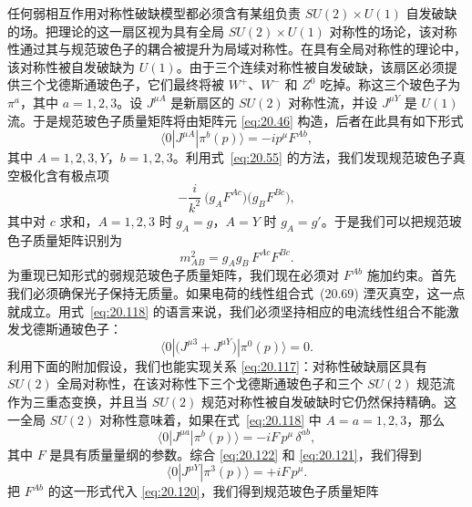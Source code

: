 任何弱相互作用对称性破缺模型都必须含有某组负责 $SU(2)\times U(1)$ 自发破缺的场。把理论的这一扇区视为具有全局 $SU(2)\times U(1)$ 对称性的场论，该对称性通过其与规范玻色子的耦合被提升为局域对称性。在具有全局对称性的理论中，该对称性被自发破缺为 $U(1)$。由于三个连续对称性被自发破缺，该扇区必须提供三个戈德斯通玻色子，它们最终将被 $W^+$、$W^-$ 和 $Z^0$ 吃掉。称这三个玻色子为 $\pi^a$，其中 $a = 1, 2, 3$。设 $J^{\mu A}$ 是新扇区的 $SU(2)$ 对称性流，并设 $J^{\mu Y}$ 是 $U(1)$ 流。于是规范玻色子质量矩阵将由矩阵元 \eqref{eq:20.46} 构造，后者在此具有如下形式
\begin{equation}
  \langle 0|J^{\mu A}|\pi^b(p)\rangle = -ip^\mu F^{Ab} ,
  \label{eq:20.118}
\end{equation}
其中 $A = 1, 2, 3, Y$，$b = 1, 2, 3$。利用式~\eqref{eq:20.55} 的方法，我们发现规范玻色子真空极化含有极点项
\begin{equation}
  -\frac{i}{k^2}\ \bigl( g_AF^{Ac} \bigr)\bigl( g_BF^{Bc} \bigr) ,
  \label{eq:20.119}
\end{equation}
其中对 $c$ 求和，$A = 1, 2, 3$ 时 $g_A = g$，$A = Y$ 时 $g_A = g'$。于是我们可以把规范玻色子质量矩阵识别为
\begin{equation}
  m^2_{AB} = g_Ag_B\,F^{Ac}F^{Bc} .
  \label{eq:20.120}
\end{equation}
为重现已知形式的弱规范玻色子质量矩阵，我们现在必须对 $F^{Ab}$ 施加约束。首先我们必须确保光子保持无质量。如果电荷的线性组合式~(20.69) 湮灭真空，这一点就成立。用式~\eqref{eq:20.118} 的语言来说，我们必须坚持相应的电流线性组合不能激发戈德斯通玻色子：
\begin{equation}
  \langle 0|\bigl( J^{\mu 3} + J^{\mu Y} \bigr)|\pi^0(p)\rangle = 0 .
  \label{eq:20.121}
\end{equation}
利用下面的附加假设，我们也能实现关系 \eqref{eq:20.117}：对称性破缺扇区具有 $SU(2)$ 全局对称性，在该对称性下三个戈德斯通玻色子和三个 $SU(2)$ 规范流作为三重态变换，并且当 $SU(2)$ 规范对称性被自发破缺时它仍然保持精确。这一全局 $SU(2)$ 对称性意味着，如果在式~\eqref{eq:20.118} 中 $A = a = 1, 2, 3$，那么
\begin{equation}
  \langle 0|J^{\mu a}|\pi^b(p)\rangle = -iF\,p^\mu\,\delta^{ab} ,
  \label{eq:20.122}
\end{equation}
其中 $F$ 是具有质量量纲的参数。综合 \eqref{eq:20.122} 和 \eqref{eq:20.121}，我们得到
\begin{equation}
  \langle 0|J^{\mu Y}|\pi^3(p)\rangle = +iF\,p^\mu .
  \label{eq:20.123}
\end{equation}
把 $F^{Ab}$ 的这一形式代入 \eqref{eq:20.120}，我们得到规范玻色子质量矩阵
